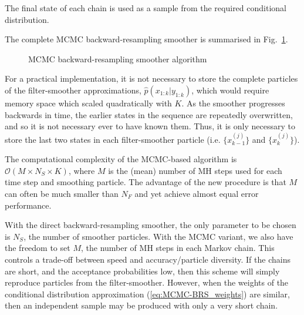 \documentclass[journal]{IEEEtran}
\begin{document}
The final state of each chain is used as a sample from the required conditional distribution.

The complete MCMC backward-resampling smoother is summarised in Fig.~\ref{alg:MCMC-BRS}.

\begin{figure}
\caption{MCMC backward-resampling smoother algorithm}
\label{alg:MCMC-BRS}
\end{figure}

For a practical implementation, it is not necessary to store the complete particles of the filter-smoother approximations, $\hat{p}(x_{1:k}|y_{1:k})$, which would require memory space which scaled quadratically with $K$. As the smoother progresses backwards in time, the earlier states in the sequence are repeatedly overwritten, and so it is not necessary ever to have known them. Thus, it is only necessary to store the last two states in each filter-smoother particle (i.e. $\{x_{k-1}^{(j)}\}$ and $\{x_{k}^{(j)}\}$).

The computational complexity of the MCMC-based algorithm is $\mathcal{O}(M \times N_S \times K)$, where $M$ is the (mean) number of MH steps used for each time step and smoothing particle. The advantage of the new procedure is that $M$ can often be much smaller than $N_F$ and yet achieve almost equal error performance.

With the direct backward-resampling smoother, the only parameter to be chosen is $N_S$, the number of smoother particles. With the MCMC variant, we also have the freedom to set $M$, the number of MH steps in each Markov chain. This controls a trade-off between speed and accuracy/particle diversity. If the chains are short, and the acceptance probabilities low, then this scheme will simply reproduce particles from the filter-smoother. However, when the weights of the conditional distribution approximation (\ref{eq:MCMC-BRS_weights}) are similar, then an independent sample may be produced with only a very short chain.
\end{document}
